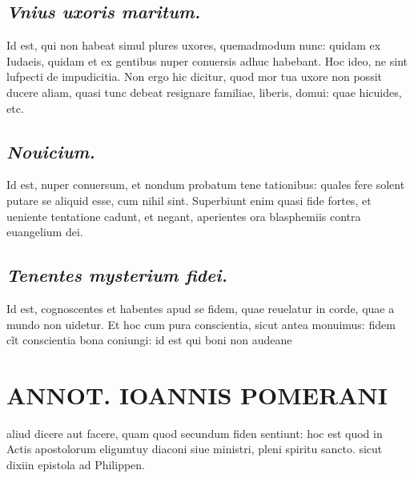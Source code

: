 \documentclass{article}
\begin{document}
\begin{pages}
\subsection*{\textit{Vnius uxoris maritum. }}\pstart Id est, qui non habeat simul plures uxores, quemadmodum nunc: quidam ex Iudaeis, quidam et ex gentibus nuper conuersis adhuc habebant. Hoc ideo, ne sint lufpecti de impudicitia. Non ergo hic dicitur, quod mor tua uxore non possit ducere aliam, quasi tunc debeat resignare familiae, liberis, domui: quae hicuides, etc.  \pend
{}
{}
\subsection*{\textit{Nouicium. }}\pstart Id est, nuper conuersum, et nondum probatum tene tationibus: quales fere solent putare se aliquid esse, cum nihil sint. Superbiunt enim quasi fide fortes, et ueniente tentatione cadunt, et negant, aperientes ora blasphemiis contra euangelium dei.  \pend
{}
{}
\subsection*{\textit{Tenentes mysterium fidei. }}\pstart Id est, cognoscentes et habentes apud se fidem, quae reuelatur in corde, quae a mundo non uidetur. Et hoc cum pura conscientia, sicut antea monuimus: fidem cĩt conscientia bona coniungi: id est qui boni non audeane  \pend
\section*{ANNOT. IOANNIS POMERANI }\pstart aliud dicere aut facere, quam quod secundum fiden sentiunt: hoc est quod in Actis apostolorum eligumtuy diaconi siue ministri, pleni spiritu sancto. sicut dixiin epistola ad Philippen.  \pend
{}
{}

\end{pages}
\end{document}
